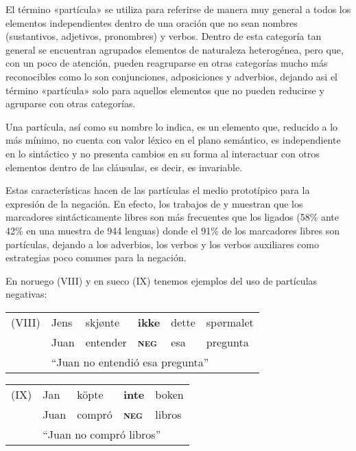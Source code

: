 El término «partícula» se utiliza para referirse de manera muy general a todos los elementos independientes dentro de una oración que no sean nombres (sustantivos, adjetivos, pronombres) y verbos. Dentro de esta categoría tan general se encuentran agrupados elementos de naturaleza heterogénea, pero que, con un poco de atención, pueden reagruparse en otras categorías mucho más reconocibles como lo son conjunciones, adposiciones y adverbios, dejando asi el término «partícula» solo para aquellos elementos que no pueden reducirse y agruparse con otras categorías.

Una partícula, así como su nombre lo indica, es un elemento que, reducido a lo más mínimo, no cuenta con valor léxico en el plano semántico, es independiente en lo sintáctico y no presenta cambios en su forma al interactuar con otros elementos dentro de las cláusulas, es decir, es invariable.

Estas características hacen de las partículas el medio prototípico para la expresión de la negación. En efecto, los trabajos de \textcolor{MidnightBlue}{\citet{morfemas}} y \textcolor{MidnightBlue}{\citet{Vossen2016}} muestran que los marcadores sintácticamente libres son más frecuentes que los ligados (58\% ante 42\% en una muestra de 944 lenguas) donde el 91\% de los marcadores libres son partículas, dejando a los adverbios, los verbos y los verbos auxiliares como estrategias poco comunes para la negación.

En noruego (VIII) y en sueco (IX) tenemos ejemplos del uso de partículas negativas: \vspace{0.5cm}

{\setmainfont{Charis SIL} 

\begin{tabular}{llllll}
(VIII) & Jens & skjønte & \textbf{ikke} & dette & spørmalet \\
& Juan & entender & \textsc{\textbf{neg}} & esa & pregunta \\
& \multicolumn{5}{l}{``Juan no entendió esa pregunta'' \qquad \textcolor{MidnightBlue}{\citep[pág. 7]{Taraldsen1985}}}
\end{tabular} \vspace{0.5cm}

\begin{tabular}{lllll}
(IX) & Jan & köpte & \textbf{inte} & boken \\
& Juan & compró & \textsc{\textbf{neg}} & libros \\
& \multicolumn{4}{l}{``Juan no compró libros'' \qquad \textcolor{MidnightBlue}{\citep[pág. 45]{Holmberg1995}}}
\end{tabular} \vspace{0.5cm}


} %

